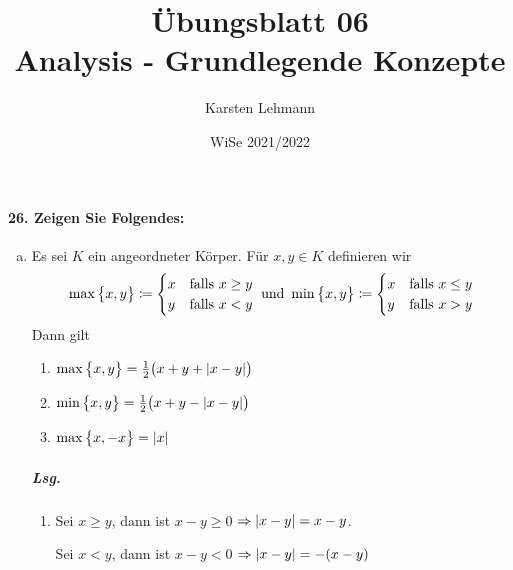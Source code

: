 \documentclass{scrreprt}
\author{Karsten Lehmann}
\date{WiSe 2021/2022}
\title{Übungsblatt 06\\Analysis - Grundlegende Konzepte}
\begin{document}
\paragraph{26. Zeigen Sie Folgendes:}
\begin{enumerate}[a)]
\item Es sei $K$ ein angeordneter Körper.
  Für $x, y \in K$ definieren wir
  \[
    \max\qty\big{x, y} \coloneqq
    \begin{cases}
      x & \text{falls } x \geq y \\
      y & \text{falls } x < y \\
    \end{cases}
    \text{ und }
    \min\qty\big{x, y} \coloneqq
    \begin{cases}
      x & \text{falls } x \leq y \\
      y & \text{falls } x > y
    \end{cases}
  \]
  Dann gilt
  \begin{enumerate}[(1)]
  \item $\max\qty\big{x, y} = \frac{1}{2} \qty\big(x + y + \abs{x - y})$
  \item $\min\qty\big{x, y} = \frac{1}{2} \qty\big(x + y - \abs{x - y})$
  \item $\max\qty\big{x, -x} = \abs{x}$
  \end{enumerate}

  \subparagraph{Lsg.}
  \begin{enumerate}[(1)]
  \item
    \begin{minipage}[t]{.4\textwidth}
      Sei $x \geq y$,  dann ist $x - y \geq 0$
      $\Rightarrow \abs{x - y} = x - y$.

    \end{minipage}
    \hfill
    \vrule
    \hfill
    \begin{minipage}[t]{.4\textwidth}
      Sei $x < y$, dann ist $x - y < 0$
      $\Rightarrow \abs{x - y} = -(x - y)$

    \end{minipage}


\end{enumerate}
\end{enumerate}
\end{document}
